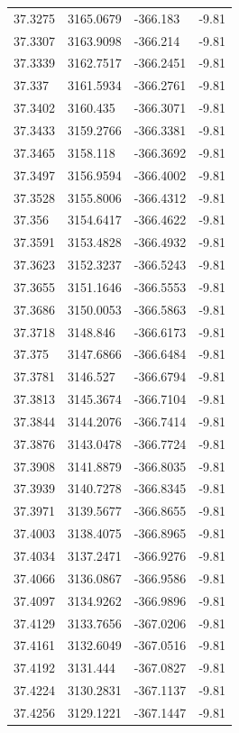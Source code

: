 \begin{table}[H]
\begin{tabular}{llll}
37.3275 & 3165.0679 & -366.183 & -9.81 \\
37.3307 & 3163.9098 & -366.214 & -9.81 \\
37.3339 & 3162.7517 & -366.2451 & -9.81 \\
37.337 & 3161.5934 & -366.2761 & -9.81 \\
37.3402 & 3160.435 & -366.3071 & -9.81 \\
37.3433 & 3159.2766 & -366.3381 & -9.81 \\
37.3465 & 3158.118 & -366.3692 & -9.81 \\
37.3497 & 3156.9594 & -366.4002 & -9.81 \\
37.3528 & 3155.8006 & -366.4312 & -9.81 \\
37.356 & 3154.6417 & -366.4622 & -9.81 \\
37.3591 & 3153.4828 & -366.4932 & -9.81 \\
37.3623 & 3152.3237 & -366.5243 & -9.81 \\
37.3655 & 3151.1646 & -366.5553 & -9.81 \\
37.3686 & 3150.0053 & -366.5863 & -9.81 \\
37.3718 & 3148.846 & -366.6173 & -9.81 \\
37.375 & 3147.6866 & -366.6484 & -9.81 \\
37.3781 & 3146.527 & -366.6794 & -9.81 \\
37.3813 & 3145.3674 & -366.7104 & -9.81 \\
37.3844 & 3144.2076 & -366.7414 & -9.81 \\
37.3876 & 3143.0478 & -366.7724 & -9.81 \\
37.3908 & 3141.8879 & -366.8035 & -9.81 \\
37.3939 & 3140.7278 & -366.8345 & -9.81 \\
37.3971 & 3139.5677 & -366.8655 & -9.81 \\
37.4003 & 3138.4075 & -366.8965 & -9.81 \\
37.4034 & 3137.2471 & -366.9276 & -9.81 \\
37.4066 & 3136.0867 & -366.9586 & -9.81 \\
37.4097 & 3134.9262 & -366.9896 & -9.81 \\
37.4129 & 3133.7656 & -367.0206 & -9.81 \\
37.4161 & 3132.6049 & -367.0516 & -9.81 \\
37.4192 & 3131.444 & -367.0827 & -9.81 \\
37.4224 & 3130.2831 & -367.1137 & -9.81 \\
37.4256 & 3129.1221 & -367.1447 & -9.81 \\

\end{tabular}
\end{table}
